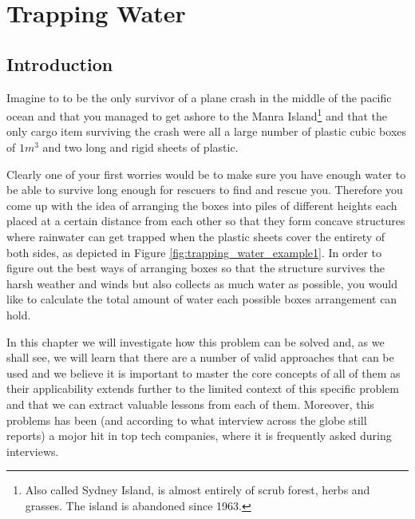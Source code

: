 %

\chapter{Trapping Water}
\label{ch:trapping_water}
\section*{Introduction}
Imagine to to be the only survivor of a plane crash in the middle of the pacific ocean and that you managed to get ashore to the Manra Island\footnote{Also called Sydney Island, is almost entirely of scrub forest, herbs and grasses. The island is abandoned since 1963.} and that the only cargo item surviving the crash were all a large number of plastic cubic boxes  of $1m^3$ and two long and rigid sheets of plastic. 

Clearly one of your first worries would be to make sure you have enough water to be able to survive long enough for rescuers to find and rescue you.
Therefore you come up with the idea of arranging the boxes into piles of different heights each placed at a certain distance from each other so that they form concave structures where rainwater can get trapped when the plastic sheets cover the entirety of both sides, as depicted in Figure \ref{fig:trapping_water_example1}. 
In order to figure out the best ways of arranging boxes so that the structure survives the harsh weather and winds but also collects as much water as possible, you would like to calculate the total amount of water each possible boxes arrangement can hold. 

In this chapter we will investigate how this problem can be solved and, as we shall see, we will learn that there are a number of valid approaches that can be used and we believe it is important to master the core concepts of all of them as their applicability extends further to the limited context of this specific problem and that we can extract valuable lessons from each of them.
Moreover, this problems has been (and according to what interview across the globe still reports) a mojor hit in top tech companies, where it is frequently asked during interviews.



